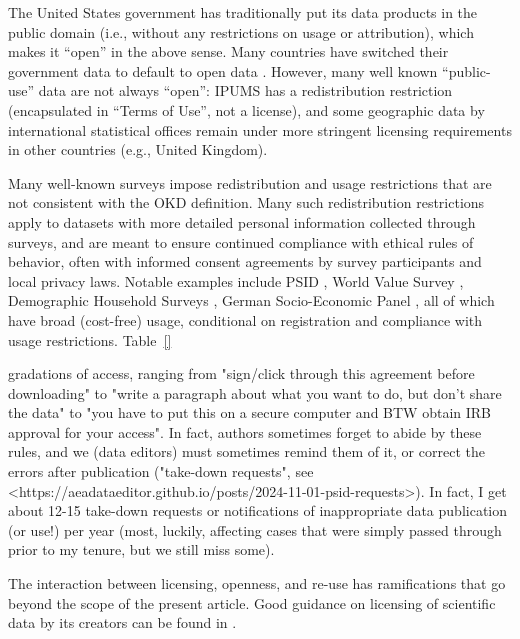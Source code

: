 \documentclass{article}
\begin{document}
The United States government has traditionally put its data products in the public domain (i.e., without any restrictions on usage or attribution), which makes it ``open'' in the above sense. Many countries have switched their government data to default to open data \parencite{statistics_canada_statistics_2012,uk_government_open_2014}. However, many well known ``public-use'' data are not always ``open'': IPUMS has a redistribution restriction (encapsulated in ``Terms of Use'', not a license), and some geographic data by international statistical offices remain under more stringent licensing requirements in other countries (e.g., United Kingdom). 

Many well-known surveys impose redistribution and usage restrictions that are not consistent with the OKD definition. Many such redistribution restrictions apply to datasets with more detailed personal information collected through surveys, and are meant to ensure continued compliance with ethical rules of behavior, often with informed consent agreements by survey participants and local privacy laws. Notable examples include  PSID \parencite{institute_for_social_research_panel_2024}, World Value Survey \parencite{haerpfer_world_2024}, Demographic Household Surveys \parencite{dhs_program_demographic_2024}, German Socio-Economic Panel \parencite{goebel_german_2019,goebel_socio-economic_2024}, all of which have broad (cost-free) usage, conditional on registration and compliance with usage restrictions. Table~\ref{}

gradations of access, ranging from "sign/click through this agreement before downloading"  to "write a paragraph about what you want to do, but don't share the data"  to "you have to put this on a secure computer and BTW obtain IRB approval for your access". In fact, authors sometimes forget to abide by these rules, and we (data editors) must sometimes remind them of it, or correct the errors after publication ("take-down requests", see <https://aeadataeditor.github.io/posts/2024-11-01-psid-requests>). In fact, I get about 12-15 take-down requests or notifications of inappropriate data publication (or use!) per year (most, luckily, affecting cases that were simply passed through prior to my tenure, but we still miss some).


The interaction between licensing, openness, and re-use has ramifications that go beyond the scope of the present article. Good guidance on licensing of scientific data by its creators can be found in \citet{stodden_enabling_2009}.
\end{document}
